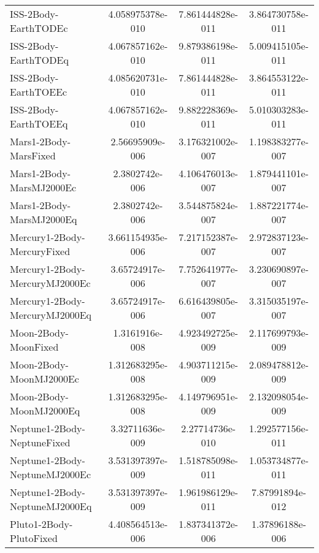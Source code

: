\begin{table}[htbp!]
\begin{tabular}{lccc}
         ISS-2Body-EarthTODEc & 4.058975378e-010 & 7.861444828e-011 & 3.864730758e-011 \\
         ISS-2Body-EarthTODEq & 4.067857162e-010 & 9.879386198e-011 & 5.009415105e-011 \\
         ISS-2Body-EarthTOEEc & 4.085620731e-010 & 7.861444828e-011 & 3.864553122e-011 \\
         ISS-2Body-EarthTOEEq & 4.067857162e-010 & 9.882228369e-011 & 5.010303283e-011 \\
         Mars1-2Body-MarsFixed & 2.56695909e-006 & 3.176321002e-007 & 1.198383277e-007 \\
         Mars1-2Body-MarsMJ2000Ec & 2.3802742e-006 & 4.106476013e-007 & 1.879441101e-007 \\
         Mars1-2Body-MarsMJ2000Eq & 2.3802742e-006 & 3.544875824e-007 & 1.887221774e-007 \\
         Mercury1-2Body-MercuryFixed & 3.661154935e-006 & 7.217152387e-007 & 2.972837123e-007 \\
         Mercury1-2Body-MercuryMJ2000Ec & 3.65724917e-006 & 7.752641977e-007 & 3.230690897e-007 \\
         Mercury1-2Body-MercuryMJ2000Eq & 3.65724917e-006 & 6.616439805e-007 & 3.315035197e-007 \\
         Moon-2Body-MoonFixed & 1.3161916e-008 & 4.923492725e-009 & 2.117699793e-009 \\
         Moon-2Body-MoonMJ2000Ec & 1.312683295e-008 & 4.903711215e-009 & 2.089478812e-009 \\
         Moon-2Body-MoonMJ2000Eq & 1.312683295e-008 & 4.149796951e-009 & 2.132098054e-009 \\
         Neptune1-2Body-NeptuneFixed & 3.32711636e-009 & 2.27714736e-010 & 1.292577156e-011 \\
         Neptune1-2Body-NeptuneMJ2000Ec & 3.531397397e-009 & 1.518785098e-011 & 1.053734877e-011 \\
         Neptune1-2Body-NeptuneMJ2000Eq & 3.531397397e-009 & 1.961986129e-011 & 7.87991894e-012 \\
         Pluto1-2Body-PlutoFixed & 4.408564513e-006 & 1.837341372e-006 & 1.37896188e-006 \\

\end{tabular}
\end{table}
